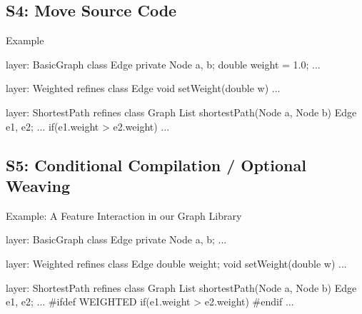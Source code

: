\subsection{S4: Move Source Code}

\begin{frame}{\myframetitle}
\end{frame}

\begin{frame}[fragile]{Example}
	\begin{mycolumns}[widths={50,50},animation=none]
\begin{codetight}{layer: BasicGraph}
class Edge {
	private Node a, b;
	double weight = 1.0;
	...
}
\end{codetight}	
\begin{codetight}{layer: Weighted}
refines class Edge {
	void setWeight(double w){ ... }
}
\end{codetight}	
	\mynextcolumn
\begin{codetight}{layer: ShortestPath}
refines class Graph {
	List shortestPath(Node a, Node b){
		Edge e1, e2;
		...
		if(e1.weight > e2.weight) 
		... 
	}
}
\end{codetight}	
	\end{mycolumns}
\end{frame}

\subsection{S5: Conditional Compilation / Optional Weaving}

\begin{frame}{\myframetitle}
\end{frame}

\begin{frame}[fragile]{Example: A Feature Interaction in our Graph Library}
	\begin{mycolumns}[widths={50,50},animation=none]
\begin{codetight}{layer: BasicGraph}
class Edge {
	private Node a, b;
	...
}
\end{codetight}	
\begin{codetight}{layer: Weighted}
refines class Edge {
	double weight;
	void setWeight(double w){ ... }
}
\end{codetight}	
	\mynextcolumn
\begin{codetight}{layer: ShortestPath}
refines class Graph {
	List shortestPath(Node a, Node b){
		Edge e1, e2;
		...
#ifdef WEIGHTED		
		if(e1.weight > e2.weight) 
#endif
		... 
	}
}
\end{codetight}	
	\end{mycolumns}
\end{frame}

